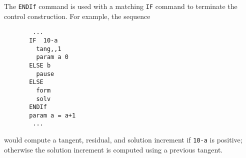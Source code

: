\headb

The {\tt ENDIf} command is used with a matching
{\tt IF} command to terminate the control construction.
For example, the sequence
\begin{verbatim}
        ...
       IF  10-a
         tang,,1
         param a 0
       ELSE b
         pause
       ELSE
         form
         solv
       ENDIf
       param a = a+1
        ...
\end{verbatim}
would compute a tangent, residual, and solution increment if {\tt 10-a}
is positive; otherwise the solution increment is computed using a
previous tangent.
\vfill\eject
